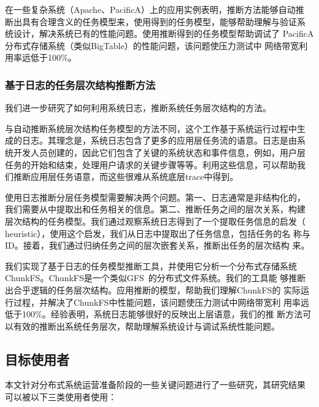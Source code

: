 在一些复杂系统（Apache、PacificA）上的应用实例表明，推断方法能够自动推
断出具有合理含义的任务模型来，使用得到的任务模型，能够帮助理解与验证系
统设计，解决系统已有的性能问题。使用推断得到的任务模型帮助调试了
PacificA 分布式存储系统（类似BigTable）的性能问题，该问题使压力测试中
网络带宽利用率远低于100\%。


\subsubsection*{基于日志的任务层次结构推断方法}


我们进一步研究了如何利用系统日志，推断系统任务层次结构的方法。

与自动推断系统层次结构任务模型的方法不同，这个工作基于系统运行过程中生
成的日志。其理念是，系统日志包含了更多的应用层任务流的语意。日志是由系
统开发人员创建的，因此它们包含了关键的系统状态和事件信息，例如，用户层
任务的开始和结束，处理用户请求的关键步骤等等。利用这些信息，可以帮助我
们推断应用层任务语意，而这些很难从系统底层trace中得到。

使用日志推断分层任务模型需要解决两个问题。第一、日志通常是非结构化的，
我们需要从中提取出和任务相关的信息。第二、推断任务之间的层次关系，构建
层次结构的任务模型。我们通过观察系统日志得到了一个提取任务信息的启发（
heuristic），使用这个启发，我们从日志中提取出了任务信息，包括任务的名
称与ID。接着，我们通过归纳任务之间的层次嵌套关系，推断出任务的层次结构
来。

我们实现了基于日志的任务模型推断工具，并使用它分析一个分布式存储系统
ChunkFS。ChunkFS是一个类似GFS~\cite{gfs}的分布式文件系统。我们的工具能
够推断出合乎逻辑的任务层次结构。应用推断的模型，帮助我们理解ChunkFS的
实际运行过程，并解决了ChunkFS中性能问题，该问题使压力测试中网络带宽利
用率远低于100\%。经验表明，系统日志能够很好的反映出上层语意，我们的推
断方法可以有效的推断出系统任务层次，帮助理解系统设计与调试系统性能问题。

\subsection{目标使用者}

本文针对分布式系统运营准备阶段的一些关键问题进行了一些研究，其研究结果
可以被以下三类使用者使用：


